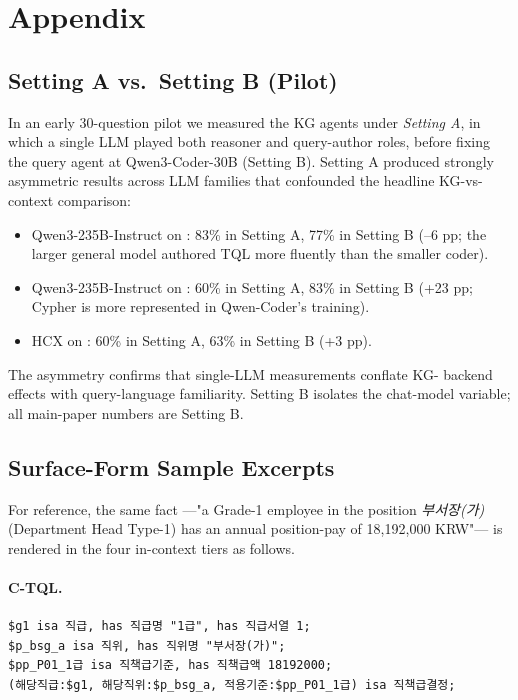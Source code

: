 \section{Appendix}\label{sec:appendix}

\subsection{Setting A vs.\ Setting B (Pilot)}

In an early 30-question pilot we measured the KG agents under
\emph{Setting A}, in which a single LLM played both reasoner and
query-author roles, before fixing the query agent at
Qwen3-Coder-30B (Setting B). Setting A produced strongly asymmetric
results across LLM families that confounded the headline KG-vs-
context comparison:

\begin{itemize}
\item Qwen3-235B-Instruct on : 83\% in
      Setting A, 77\% in Setting B (--6 pp; the larger general
      model authored TQL more fluently than the smaller coder).
\item Qwen3-235B-Instruct on : 60\% in
      Setting A, 83\% in Setting B (+23 pp; Cypher is more
      represented in Qwen-Coder's training).
\item HCX on : 60\% in Setting A, 63\% in
      Setting B (+3 pp).
\end{itemize}

The asymmetry confirms that single-LLM measurements conflate KG-
backend effects with query-language familiarity. Setting B isolates
the chat-model variable; all main-paper numbers are Setting B.

\subsection{Surface-Form Sample Excerpts}

For reference, the same fact —"a Grade-1 employee in the position
\emph{부서장(가)} (Department Head Type-1) has an annual
position-pay of 18{,}192{,}000 KRW"— is rendered in the four
in-context tiers as follows.

\paragraph{C-TQL.}
\begin{verbatim}
$g1 isa 직급, has 직급명 "1급", has 직급서열 1;
$p_bsg_a isa 직위, has 직위명 "부서장(가)";
$pp_P01_1급 isa 직책급기준, has 직책급액 18192000;
(해당직급:$g1, 해당직위:$p_bsg_a, 적용기준:$pp_P01_1급) isa 직책급결정;
\end{verbatim}

